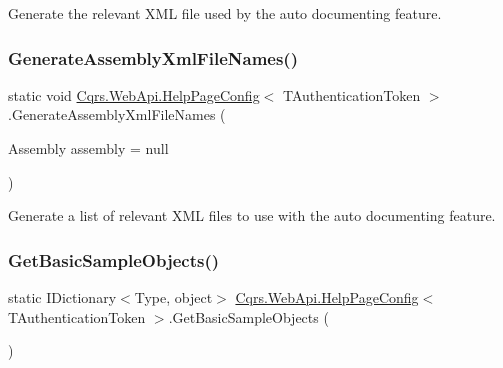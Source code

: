 Generate the relevant X\+ML file used by the auto documenting feature. 

\mbox{\label{classCqrs_1_1WebApi_1_1HelpPageConfig_a36bf3691c8b3cbe26fa3e72456170271_a36bf3691c8b3cbe26fa3e72456170271}} 
\subsubsection{\texorpdfstring{Generate\+Assembly\+Xml\+File\+Names()}{GenerateAssemblyXmlFileNames()}}
{\footnotesize\ttfamily static void \hyperlink{classCqrs_1_1WebApi_1_1HelpPageConfig}{Cqrs.\+Web\+Api.\+Help\+Page\+Config}$<$ T\+Authentication\+Token $>$.Generate\+Assembly\+Xml\+File\+Names (\begin{DoxyParamCaption}\item[{Assembly}]{assembly = {\ttfamily null} }\end{DoxyParamCaption})\hspace{0.3cm}{\ttfamily [static]}}



Generate a list of relevant X\+ML files to use with the auto documenting feature. 

\mbox{\label{classCqrs_1_1WebApi_1_1HelpPageConfig_a9015771102b0ab21da20a0684fe6a88a_a9015771102b0ab21da20a0684fe6a88a}} 
\subsubsection{\texorpdfstring{Get\+Basic\+Sample\+Objects()}{GetBasicSampleObjects()}}
{\footnotesize\ttfamily static I\+Dictionary$<$Type, object$>$ \hyperlink{classCqrs_1_1WebApi_1_1HelpPageConfig}{Cqrs.\+Web\+Api.\+Help\+Page\+Config}$<$ T\+Authentication\+Token $>$.Get\+Basic\+Sample\+Objects (\begin{DoxyParamCaption}{ }\end{DoxyParamCaption})\hspace{0.3cm}{\ttfamily [static]}}



